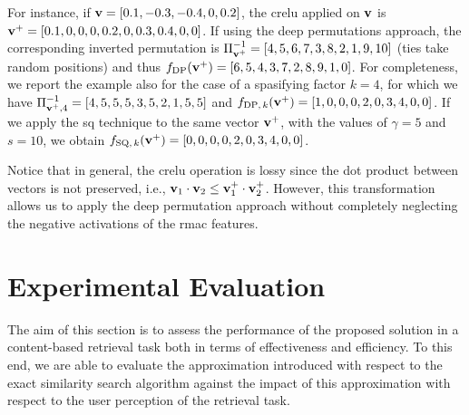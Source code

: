 For instance, if $\mathbf{v} = [0.1, -0.3, -0.4, 0, 0.2]$, the \gls{crelu} applied on $\mathbf{v}$ is $\mathbf{v}^+ = [0.1, 0, 0, 0, 0.2, 0, 0.3, 0.4, 0, 0]$.
If using the deep permutations approach, the corresponding inverted permutation is $\Pi^{-1}_{\mathbf{v}^+} = [4, 5, 6, 7, 3, 8, 2, 1, 9, 10]$ (ties take random positions) and thus $f_\text{DP}(\mathbf{v}^+) = [6, 5, 4, 3, 7, 2, 8, 9, 1, 0]$.
For completeness, we report the example also for the case of a spasifying factor $k=4$, for which we have $\Pi^{-1}_{\mathbf{v}^+,4} = [4, 5, 5, 5, 3, 5, 2, 1, 5, 5]$ and $f_{\text{DP},\, k}(\mathbf{v}^+) = [1, 0, 0, 0, 2, 0, 3, 4, 0, 0]$.
If we apply the \gls{sq} technique to the same vector $\mathbf{v}^+$, with the values of $\gamma = 5$ and $s=10$, we obtain $f_{\text{SQ}, \, k}(\mathbf{v}^+) = [0, 0, 0, 0, 2, 0, 3, 4, 0, 0]$.

Notice that in general, the \gls{crelu} operation is lossy since the dot product between vectors is not preserved, i.e., $\mathbf{v}_1 \cdot \mathbf{v}_2 \leq \mathbf{v}_1^+ \cdot \mathbf{v}_2^+$.
However, this transformation allows us to apply the deep permutation approach without completely neglecting the negative activations of the \gls{rmac} features.

\section{Experimental Evaluation}
\label{sec:str:experiments}

The aim of this section is to assess the performance of the proposed solution in a content-based retrieval task both in terms of effectiveness and efficiency.
To this end, we are able to evaluate the approximation introduced with respect to the exact similarity search algorithm against the impact of this approximation with respect to the user perception of the retrieval task.

